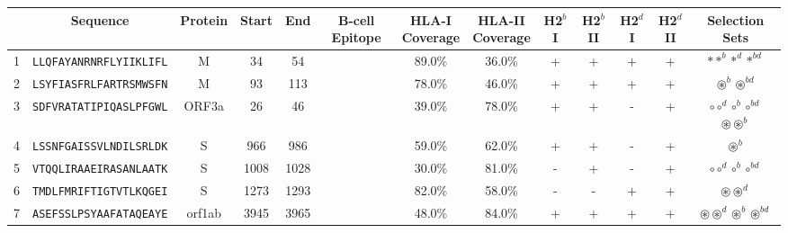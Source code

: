 \begin{tabular}{rcccccccccccc}
\toprule
{} &                        Sequence & Protein &  Start &   End & B-cell Epitope & \Centerstack{HLA-I \\ Coverage} & \Centerstack{HLA-II \\ Coverage} & H2$^{b}$ I & H2$^{b}$ II & H2$^{d}$ I & H2$^{d}$ II &                                                                         Selection Sets \\
\midrule
1  &  \texttt{LLQFAYANRNRFLYIIKLIFL} &       M &     34 &    54 &                &                          89.0\% &                           36.0\% &          + &           + &          + &           + &                                                       $ \ast \ast^b \ast^d \ast^{bd} $ \\
2  &  \texttt{LSYFIASFRLFARTRSMWSFN} &       M &     93 &   113 &                &                          78.0\% &                           46.0\% &          + &           + &          + &           + &                                                     $ \circledast^b \circledast^{bd} $ \\
3  &  \texttt{SDFVRATATIPIQASLPFGWL} &   ORF3a &     26 &    46 &                &                          39.0\% &                           78.0\% &          + &           + &          - &           + &    \Centerstack{  $\circ \circ^d \circ^b \circ^{bd}$ \\  $\circledast \circledast^b$ } \\
4  &  \texttt{LSSNFGAISSVLNDILSRLDK} &       S &    966 &   986 &                &                          59.0\% &                           62.0\% &          + &           + &          - &           + &                                                                      $ \circledast^b $ \\
5  &  \texttt{VTQQLIRAAEIRASANLAATK} &       S &   1008 &  1028 &                &                          30.0\% &                           81.0\% &          - &           + &          - &           + &                                                   $ \circ \circ^d \circ^b \circ^{bd} $ \\
6  &  \texttt{TMDLFMRIFTIGTVTLKQGEI} &       S &   1273 &  1293 &                &                          82.0\% &                           58.0\% &          - &           - &          + &           + &                                                          $ \circledast \circledast^d $ \\
7  &  \texttt{ASEFSSLPSYAAFATAQEAYE} &  orf1ab &   3945 &  3965 &                &                          48.0\% &                           84.0\% &          + &           + &          + &           + &                           $ \circledast \circledast^d \circledast^b \circledast^{bd} $ \\

\end{tabular}
